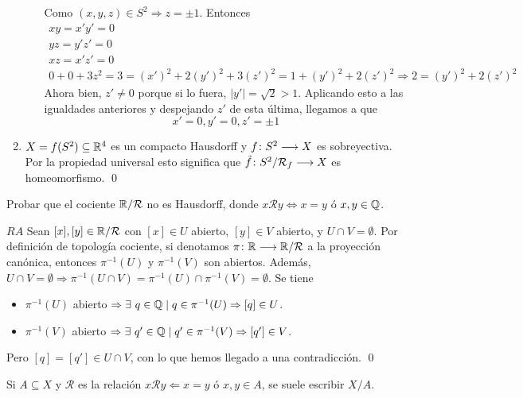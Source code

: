 \documentclass[GTS.tex]{subfiles}
\begin{document}
\begin{ejer}
\begin{solucion}
\begin{enumerate}
\begin{itemize}
Como $(x,y,z)\in S^2\Rightarrow z=\pm 1$. Entonces
\begin{gather*}
xy=x'y'=0\\
yz=y'z'=0\\
xz=x'z'=0\\
0+0+3z^2=3=(x')^2+2(y')^2+3(z')^2=1+(y')^2+2(z')^2\Rightarrow 2=(y')^2+2(z')^2
\end{gather*}
Ahora bien, $z'\neq 0$ porque si lo fuera, $|y'|=\sqrt{2}>1$. Aplicando esto a las igualdades anteriores y despejando $z'$ de esta última, llegamos a que
\[
x'=0, y'=0, z'=\pm 1
\]
\end{itemize}
\item $X=f(S^2)\subseteq\mathbb{R}^4$ es un compacto Hausdorff y $f\colon{S^2}\longrightarrow{X}$ es sobreyectiva. Por la propiedad universal esto significa que $\tilde{f}\colon{S^2/\mathcal{R}_f}\longrightarrow{X}$ es homeomorfismo. \qed
\end{enumerate}
\end{solucion}
\end{ejer}

\begin{ejer} Probar que el cociente $\mathbb{R}/\mathcal{R}$ no es Hausdorff, donde $x\mathcal{R}y\Leftrightarrow x=y$ ó $x,y\in\mathbb{Q}$.
\begin{solucion}
$\boxed{RA}$ Sean $[x],[y]\in\mathbb{R}/\mathcal{R}$ con $[x]\in U$ abierto, $[y]\in V$ abierto, y $U\cap V=\emptyset$. Por definición de topología cociente, si denotamos $\pi\colon{\mathbb{R}}\longrightarrow{\mathbb{R}/\mathcal{R}}$ a la proyección canónica, entonces $\pi^{-1}(U)$ y $\pi^{-1}(V)$ son abiertos. Además, $U\cap V=\emptyset\Rightarrow \pi^{-1}(U\cap V)=\pi^{-1}(U)\cap\pi^{-1}(V)=\emptyset$. Se tiene
\begin{itemize}
\item $\pi^{-1}(U)$ abierto $\Rightarrow \exists\ q\in\mathbb{Q}\mid q\in\pi^{-1}(U)\Rightarrow [q]\in U$.
\item $\pi^{-1}(V)$ abierto $\Rightarrow \exists\ q'\in\mathbb{Q}\mid q'\in\pi^{-1}(V)\Rightarrow [q']\in V$.
\end{itemize}
Pero $[q]=[q']\in U\cap V$, con lo que hemos llegado a una contradicción. \qed
\end{solucion}
\end{ejer}

\vspace{0.2cm}

\begin{nota} Si $A\subseteq X$ y $\mathcal{R}$ es la relación $x\mathcal{R}y\Leftarrow x=y$ ó $x,y\in A$, se suele escribir $X/A$.
\end{nota}
\end{document}
